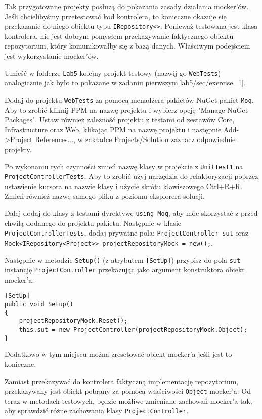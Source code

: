 Tak przygotowane projekty posłużą do pokazania zasady działania mocker'ów. Jeśli chcielibyśmy przetestować kod kontrolera, to konieczne okazuje się przekazanie do niego obiektu typu \texttt{IRepository<>}. Ponieważ testowana jest klasa kontrolera, nie jest dobrym pomysłem przekazywanie faktycznego obiektu repozytorium, który komunikowałby się z bazą danych. Właściwym podejściem jest wykorzystanie mocker'ów. 



Umieść w folderze \texttt{Lab5} kolejny projekt testowy (nazwij go \texttt{WebTests}) analogicznie jak było to pokazane w zadaniu pierwszym\ref{lab5/sec/exercise_1}.

Dodaj do projektu \texttt{WebTests} za pomocą menadżera pakietów NuGet pakiet \texttt{Moq}. Aby to zrobić kliknij PPM na nazwę projektu i wybierz opcję "Manage NuGet Packages". Ustaw również zależność projektu z testami od zestawów Core, Infrastructure oraz Web, klikając PPM na nazwę projektu i następnie Add->Project References..., w zakładce Projects/Solution zaznacz odpowiednie projekty. 

Po wykonaniu tych czynności zmień nazwę klasy w projekcie z \texttt{UnitTest1} na \texttt{ProjectControllerTests}. Aby to zrobić użyj narzędzia do refaktoryzacji poprzez ustawienie kursora na nazwie klasy i użycie skrótu klawiszowego Ctrl+R+R. Zmień również nazwę samego pliku z poziomu eksplorera solucji.

Dalej dodaj do klasy z testami dyrektywę \texttt{using Moq}, aby móc skorzystać z przed chwilą dodanego do projektu pakietu. Następnie w klasie \texttt{ProjectControllerTests}, dodaj prywatne pola: \texttt{ProjectController sut} oraz \texttt{Mock<IRepository<Project>> projectRepositoryMock = new();}.

Następnie w metodzie \texttt{Setup()} (z atrybutem \texttt{[SetUp]}) przypisz do pola \texttt{sut} instancję  \texttt{ProjectController} przekazując jako argument konstruktora obiekt mocker'a:
\begin{lstlisting}
[SetUp]
public void Setup() 
{
	projectRepositoryMock.Reset();
	this.sut = new ProjectController(projectRepositoryMock.Object);
}
\end{lstlisting}
Dodatkowo w tym miejscu można zresetować obiekt mocker'a jeśli jest to konieczne.

Zamiast przekazywać do kontrolera faktyczną implementację repozytorium, przekazywany jest obiekt pobrany za pomocą właściwości \texttt{Object} mocker'a. Od teraz w metodach testowych, będzie możliwe zmieniane zachowań mocker'a tak, aby sprawdzić różne zachowania klasy \texttt{ProjectController}.


